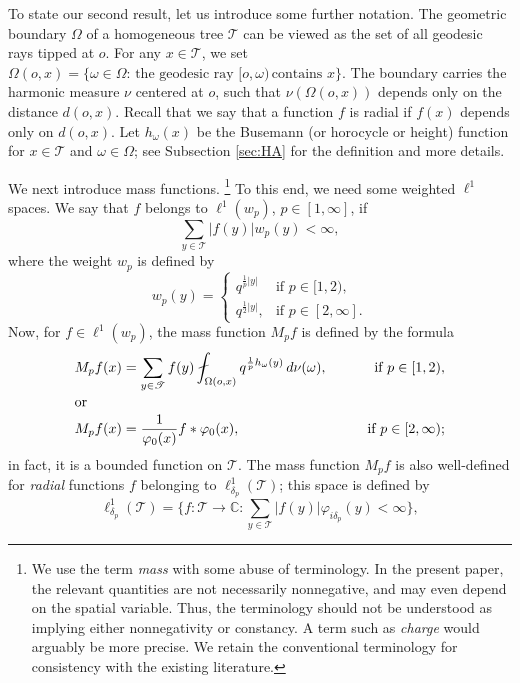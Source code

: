 \documentclass[10pt,a4paper]{amsart}
\renewcommand\mathcal{\mathscr}
\theoremstyle{plain}
\theoremstyle{remark}
\theoremstyle{definition}
\begin{document}
To state our second result, let us introduce some further notation. The geometric boundary $\Omega$ of a homogeneous tree $\mathcal{T}$ can be viewed as the set of all geodesic rays tipped at $o$. For
	any $x \in  \mathcal{T}$, we set $\Omega(o, x)=\{\omega\in \Omega: \, \text{the geodesic ray } [o,\omega) \, \text{contains } x\}$. The boundary 
	carries the harmonic measure $\nu$ centered at $o$, such that $\nu(\Omega(o, x))$ depends only on the distance
	$d(o, x)$. Recall that we say that a function $f$ is radial if $f(x)$ depends only on $d(o, x)$. 
    Let $h_{\omega}(x)$ be the Busemann (or horocycle or height) function for $x \in  \mathcal{T}$ and $\omega \in \Omega$; see Subsection \ref{sec:HA} for the definition and more details.
	
	We next introduce mass functions. \footnote{We use the term \textit{mass} with some abuse of terminology. In the present paper, the relevant quantities are not necessarily nonnegative, and may even depend on the spatial variable. Thus, the terminology should not be understood as implying either nonnegativity or constancy. A term such as \textit{charge}  would arguably be more precise. We retain the conventional terminology for consistency with the existing literature.} To this end, we need some weighted $\ell^1$ spaces. We say that $f$ belongs to $\ell^1(w_p)$,
	$p \in [1, \infty]$, if
	\[
	\sum_{y \in \mathcal{T}} |f(y)| w_p(y) < \infty,
	\]
	where the weight $w_p$ is defined by
	\begin{equation}\label{eq:defwp}
	w_p(y) =
	\begin{cases} q^{\frac{1}{p}|y|}  &\text{if } p \in [1, 2), \\
		q^{\frac{1}{2}|y|} , &\text{if } p \in [2, \infty].
	\end{cases}
	\end{equation}
	Now, for $f \in \ell^1(w_p)$, the mass function $M_pf$ is defined by the formula
	\begin{align*} 
		M_pf(x) &= \sum_{y \in \mathcal{T}} f(y)	
		\fint_{\Omega(o,x)} q^{\frac{1}{p}h_{\omega}(y)}\, d\nu(\omega), \qquad &\text{if } p \in [1, 2), \\
		\intertext{or}
		M_pf(x) &= \frac{1}{\varphi_0(x)} f\ast\varphi_0(x), &\text{if } 
		p \in [2, \infty);  
	\end{align*}
in fact, it is a bounded function on $\mathcal{T}$. The mass function $M_pf$ is also well-defined for \textit{radial} functions $f$ belonging to $ \ell^1_{\delta_p}(\mathcal{T})$; this space is defined by
\begin{equation}\label{eq:defdeltap}		
\ell^1_{\delta_p}(\mathcal{T}) =
		\Big\{f : \mathcal{T} \to \mathbb{C}: \sum_{y \in \mathcal{T}} |f(y)| \varphi_{i\delta_p}(y) < \infty
		\Big\},
	\end{equation}
\end{document}
